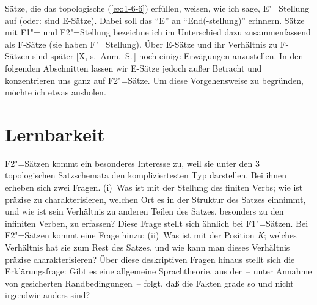 \documentclass[output=paper]{langsci/langscibook}
\begin{document}
Sätze, die das topologische  (\ref{ex:1-6-6}) erfüllen, weisen, wie ich sage, E"=Stellung
auf (oder: sind E-Sätze). Dabei soll das "`E"' an "`End(-stellung)"' erinnern. Sätze mit
F1"= und F2"=Stellung bezeichne ich im Unterschied dazu zusammenfassend als F-Sätze (sie haben F"=Stellung). Über E-Sätze und ihr Verhältnis zu F-Sätzen sind später [X, s.\ Anm.\ S.\,\pageref{fn-herausgeber-topo}]\label{X:10}
noch einige Erwägungen anzustellen. In den folgenden Abschnitten lassen wir E-Sätze jedoch außer Betracht und konzentrieren uns ganz auf F2"=Sätze. Um diese Vorgehensweise zu begründen, möchte ich etwas ausholen.

\section{Lernbarkeit}%
\label{sec:1-7}

\ssubsection{}%
\label{subsec:1-7.1}
F2"=Sätzen kommt ein besonderes Interesse zu, weil sie unter den 3
topologischen Satzschemata den kompliziertesten Typ darstellen. Bei
ihnen erheben sich zwei Fragen. (i)~Was ist mit der Stellung des
finiten Verbs; wie ist präzise zu charakterisieren, welchen Ort es in
der Struktur des Satzes einnimmt, und wie ist sein Verhältnis zu
anderen Teilen des Satzes, besonders zu den infiniten Verben, zu
erfassen?  Diese Frage stellt sich ähnlich bei F1"=Sätzen. Bei
F2"=Sätzen kommt eine Frage hinzu: (ii)~Was ist mit der Position
\textit{K}; welches Verhältnis hat sie zum Rest des Satzes, und wie
kann man dieses Verhältnis präzise charakterisieren? Über diese
deskriptiven Fragen hinaus stellt sich die Erklärungsfrage: Gibt es
eine allgemeine Sprachtheorie, aus der~-- unter Annahme von
gesicherten Randbedingungen~-- folgt, daß die Fakten grade so und
nicht irgendwie anders sind?
\end{document}
